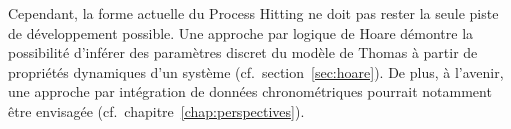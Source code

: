 Cependant, la forme actuelle du Process Hitting ne doit pas rester la seule piste de développement possible.
Une approche par logique de Hoare démontre la possibilité d'inférer des paramètres discret du modèle de Thomas à partir de propriétés dynamiques d'un système (cf.~section~\ref{sec:hoare}).
De plus, à l'avenir, une approche par intégration de données chronométriques pourrait notamment être envisagée (cf.~chapitre~\ref{chap:perspectives}).

